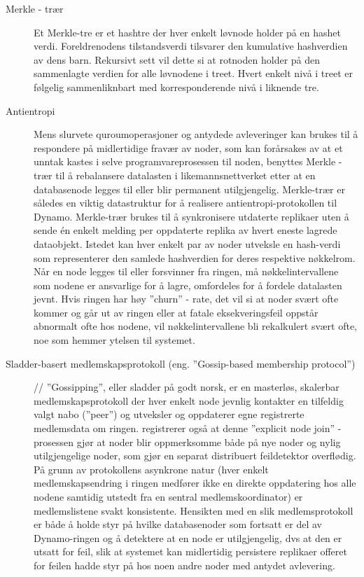 \begin{description}
  \item [Merkle - trær] Et Merkle-tre er et hashtre der hver enkelt løvnode holder på en hashet verdi. Foreldrenodens tilstandsverdi tilsvarer den kumulative hashverdien av dens barn. Rekursivt sett vil dette si at rotnoden holder på den sammenlagte verdien for alle løvnodene i treet. Hvert enkelt nivå i treet er følgelig sammenliknbart med korresponderende nivå i liknende tre.
  \item [Antientropi] Mens slurvete quroumoperasjoner og antydede avleveringer kan brukes til å respondere på midlertidige fravær av noder, som kan forårsakes av at et unntak kastes i selve programvareprosessen til noden, benyttes Merkle - trær til å rebalansere datalasten i likemannsnettverket etter at en databasenode legges til eller blir permanent utilgjengelig. Merkle-trær er således en viktig datastruktur for å realisere antientropi-protokollen til Dynamo. Merkle-trær brukes til å synkronisere utdaterte replikaer uten å sende én enkelt melding per oppdaterte replika av hvert eneste lagrede dataobjekt. Istedet kan hver enkelt par av noder utveksle en hash-verdi som representerer den samlede hashverdien for deres respektive nøkkelrom. Når en node legges til eller forsvinner fra ringen, må nøkkelintervallene som nodene er ansvarlige for å lagre, omfordeles for å fordele datalasten jevnt. Hvis ringen har høy ''churn'' - rate, det vil si at noder svært ofte kommer og går ut av ringen eller at fatale eksekveringsfeil oppstår abnormalt ofte hos nodene, vil nøkkelintervallene bli rekalkulert svært ofte, noe som hemmer ytelsen til systemet.
  \item [Sladder-basert medlemskapsprotokoll (eng. ''Gossip-based membership protocol'')] // ''Gossipping'', eller sladder på godt norsk, er en masterløs, skalerbar medlemskapsprotokoll der hver enkelt node jevnlig kontakter en tilfeldig valgt nabo (''peer'') og utveksler og oppdaterer egne registrerte medlemsdata om ringen. \cite{decandia2007} registrerer også at denne ''explicit node join'' - prosessen gjør at noder blir oppmerksomme både på nye noder og nylig utilgjengelige noder, som gjør en separat distribuert feildetektor overflødig. På grunn av protokollens asynkrone natur (hver enkelt medlemskapsendring i ringen medfører ikke en direkte oppdatering hos alle nodene samtidig utstedt fra en sentral medlemskoordinator) er medlemslistene svakt konsistente. Hensikten med en slik medlemsprotokoll er både å holde styr på hvilke databasenoder som fortsatt er del av Dynamo-ringen og å detektere at en node er utilgjengelig, dvs at den er utsatt for feil, slik at systemet kan midlertidig persistere replikaer offeret for feilen hadde styr på hos noen andre noder med antydet avlevering.

\end{description}
